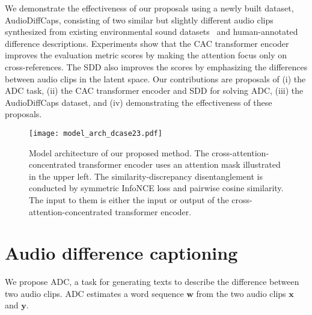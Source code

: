 We demonstrate the effectiveness of our proposals using a newly built dataset, AudioDiffCaps, consisting of two similar but slightly different audio clips synthesized from existing environmental sound datasets~\cite{fonseca2020fsd50k, piczak2015dataset} and human-annotated difference descriptions. 
Experiments show that the CAC transformer encoder improves the evaluation metric scores by making the attention focus only on cross-references. The SDD also improves the scores by emphasizing the differences between audio clips in the latent space. 
Our contributions are proposals of (i) the ADC task, (ii) the CAC transformer encoder and SDD for solving ADC, (iii) the AudioDiffCaps dataset, and (iv) demonstrating the effectiveness of these proposals.

\begin{figure*}[t]
\vspace{-9pt}
  \centering
\texttt{[image: model\_arch\_dcase23.pdf]} 
\vspace{-5pt}
  \caption{
  Model architecture of our proposed method. 
  The cross-attention-concentrated transformer encoder uses an attention mask illustrated in the upper left. 
  The similarity-discrepancy disentanglement is conducted by symmetric InfoNCE loss and pairwise cosine similarity. The input to them is either the input or output of the cross-attention-concentrated transformer encoder.}
  \label{fig:model_arch}
  \vspace{-10pt}
\end{figure*}

\section{Audio difference captioning}
We propose ADC, a task for generating texts to describe the difference between two audio clips.
ADC estimates a word sequence $\boldsymbol{w}$ from the two audio clips $\boldsymbol{x}$ and $\boldsymbol{y}$. 

